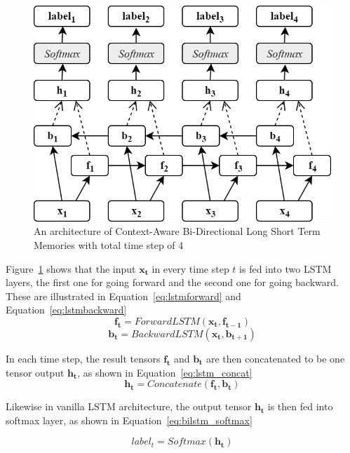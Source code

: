 \begin{figure}
	\centering
	\includegraphics[width=0.75\linewidth]{images/blstm}
	\caption{An architecture of Context-Aware Bi-Directional Long Short Term Memories with total time step of 4}
	\label{fig:bilstm}
\end{figure}

Figure~\ref{fig:bilstm} shows that the input $\mathbf{x_{t}}$ in every time step $t$ is fed into two LSTM layers, the first one for going forward and the second one for going backward. These are illustrated in Equation~\ref{eq:lstmforward} and Equation~\ref{eq:lstmbackward}
\begin{equation}
\label{eq:lstmforward}
\mathbf{f_{t}} = ForwardLSTM(\mathbf{x_{t}}, \mathbf{f_{t-1}})
\end{equation}
\begin{equation}
\label{eq:lstmbackward}
\mathbf{b_{t}} = BackwardLSTM(\mathbf{x_{t}}, \mathbf{b_{t+1}})
\end{equation}

In each time step, the result tensors $\mathbf{f_{t}}$ and $\mathbf{b_{t}}$ are then concatenated to be one tensor output $\mathbf{h_{t}}$, as shown in Equation~\ref{eq:lstm_concat}
\begin{equation}
\label{eq:lstm_concat}
\mathbf{h_{t}} = Concatenate(\mathbf{f_{t}}, \mathbf{b_{t}})
\end{equation}

Likewise in vanilla LSTM architecture, the output tensor $\mathbf{h_{t}}$ is then fed into softmax layer, as shown in Equation~\ref{eq:bilstm_softmax}

\begin{equation}
\label{eq:bilstm_softmax}
label_{t} = Softmax(\mathbf{h_{t}})
\end{equation}

